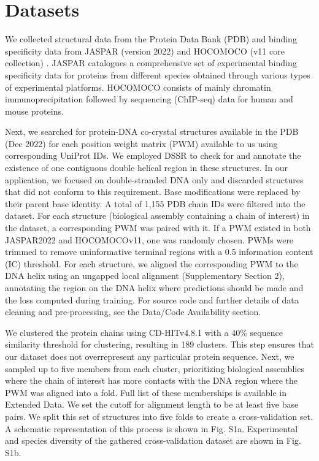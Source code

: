 \section{Datasets}
We collected structural data from the Protein Data Bank (PDB) \citep{Berman2000} and binding specificity data from JASPAR (version 2022) \citep{Jaime2022}  and HOCOMOCO (v11 core collection) \citep{kulakovskiy2018hocomoco}. JASPAR catalogues a comprehensive set of experimental binding specificity data for proteins from different species obtained through various types of experimental platforms. HOCOMOCO consists of mainly chromatin immunoprecipitation followed by sequencing (ChIP-seq) \citep{Park2009} data for human and mouse proteins.
\par
Next, we searched for protein-DNA co-crystal structures available in the PDB (Dec 2022) for each position weight matrix (PWM) available to us using corresponding UniProt IDs. We employed DSSR \citep{lu2015dssr} to check for and annotate the existence of one contiguous double helical region in these structures. In our application, we focused on double-stranded DNA only and discarded structures that did not conform to this requirement. Base modifications were replaced by their parent base identity. A total of 1,155 PDB chain IDs were filtered into the dataset. For each structure (biological assembly containing a chain of interest) in the dataset, a corresponding PWM was paired with it. If a PWM existed in both JASPAR2022 and HOCOMOCOv11, one was randomly chosen. PWMs were trimmed to remove uninformative terminal regions with a 0.5 information content (IC) threshold. For each structure, we aligned the corresponding PWM to the DNA helix using an ungapped local alignment (Supplementary Section 2), annotating the region on the DNA helix where predictions should be made and the loss computed during training. For source code and further details of data cleaning and pre-processing, see the Data/Code Availability section.
\par
We clustered the protein chains using CD-HITv4.8.1 \citep{fu2012cd} with a 40\% sequence similarity threshold for clustering, resulting in 189 clusters. This step ensures that our dataset does not overrepresent any particular protein sequence. Next, we sampled up to five members from each cluster, prioritizing biological assemblies where the chain of interest has more contacts with the DNA region where the PWM was aligned into a fold. Full list of these memberships is available in Extended Data. We set the cutoff for alignment length to be at least five base pairs. We split this set of structures into five folds to create a cross-validation set. A schematic representation of this process is shown in Fig. S1a. Experimental and species diversity of the gathered cross-validation dataset are shown in Fig. S1b.
